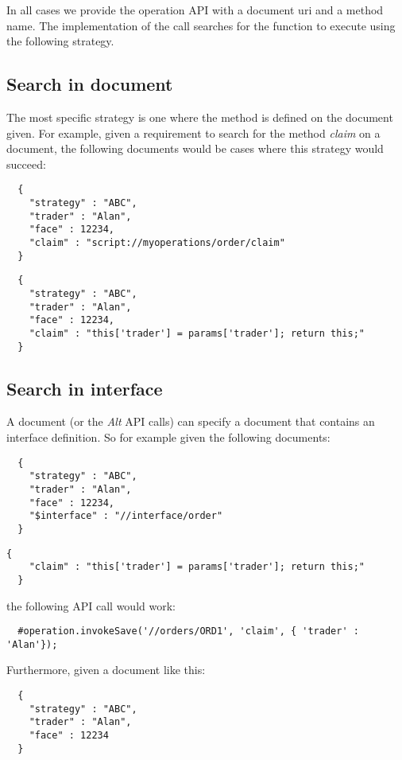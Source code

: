 In all cases we provide the operation API with a document uri and a method name. The implementation of the call searches
for the function to execute using the following strategy.

\subsection{Search in document}
The most specific strategy is one where the method is defined on the document given. For example, given a requirement to
search for the method \emph{claim} on a document, the following documents would be cases where this strategy would
succeed:

\begin{lstlisting}
  {
    "strategy" : "ABC",
    "trader" : "Alan",
    "face" : 12234,
    "claim" : "script://myoperations/order/claim"
  }
\end{lstlisting}

\begin{lstlisting}
  {
    "strategy" : "ABC",
    "trader" : "Alan",
    "face" : 12234,
    "claim" : "this['trader'] = params['trader']; return this;"
  }
\end{lstlisting}

\subsection{Search in interface}
A \Rapture document (or the \emph{Alt} API calls) can specify a document that contains an interface definition. So for example given
the following documents:

\begin{lstlisting}
  {
    "strategy" : "ABC",
    "trader" : "Alan",
    "face" : 12234,
    "$interface" : "//interface/order"
  }
\end{lstlisting}

\begin{lstlisting}[caption={//interface/order}]
  {
    "claim" : "this['trader'] = params['trader']; return this;"
  }
\end{lstlisting}

the following API call would work:

\begin{lstlisting}
  #operation.invokeSave('//orders/ORD1', 'claim', { 'trader' : 'Alan'});
\end{lstlisting}

Furthermore, given a document like this:

\begin{lstlisting}
  {
    "strategy" : "ABC",
    "trader" : "Alan",
    "face" : 12234
  }
\end{lstlisting}


